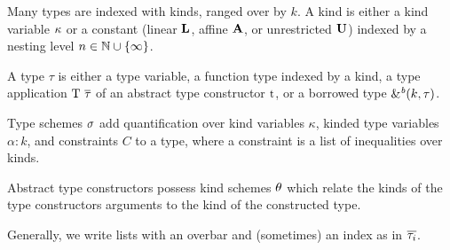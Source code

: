 Many types are indexed with kinds, ranged over by $k$.
A kind is either a kind variable $\kvar$ or a constant
(linear $\klin$, affine $\kaff$, or unrestricted $\kun$) indexed
by a nesting level $n \in \Nat \cup \{\infty\}$.

A type $\tau$ is either a type variable, a function type indexed by a
kind,
a type application $\tapp{\tcon}{\Multi{\tau}}$ of an abstract type constructor
$\T t$, or a borrowed type  $\borrowty{k}{\tau}$.

Type schemes $\schm$ add quantification over kind
variables $\kappa$, kinded type variables $\alpha:k$, and constraints
$C$ to a type, where a constraint is a list of inequalities over
kinds.

Abstract type constructors possess kind schemes $\kschm$ which relate
the kinds of the type constructors arguments to the kind of the
constructed type.

Generally, we write lists with an overbar and (sometimes) an index as
in $\Multi[i]\tau$.





